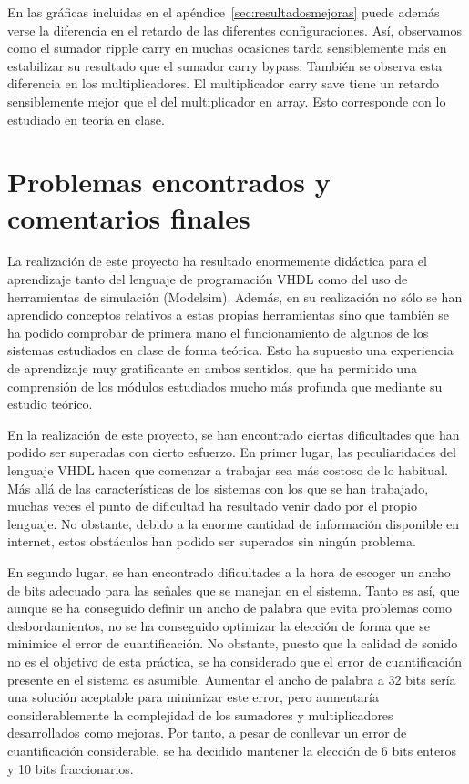 \documentclass[a4paper,12pt]{article}
\begin{document}
En las gráficas incluidas en el apéndice~\ref{sec:resultadosmejoras} puede además verse la diferencia en el retardo de las diferentes configuraciones. Así, observamos como el sumador ripple carry en muchas ocasiones tarda sensiblemente más en estabilizar su resultado que el sumador carry bypass. También se observa esta diferencia en los multiplicadores. El multiplicador carry save tiene un retardo sensiblemente mejor que el del multiplicador en array. Esto corresponde con lo estudiado en teoría en clase.

\section{Problemas encontrados y comentarios finales}
La realización de este proyecto ha resultado enormemente didáctica para el aprendizaje tanto del lenguaje de programación VHDL como del uso de herramientas de simulación (Modelsim). Además, en su realización no sólo se han aprendido conceptos relativos a estas propias herramientas sino que también se ha podido comprobar de primera mano el funcionamiento de algunos de los sistemas estudiados en clase de forma teórica. Esto ha supuesto una experiencia de aprendizaje muy gratificante en ambos sentidos, que ha permitido una comprensión de los módulos estudiados mucho más profunda que mediante su estudio teórico.

En la realización de este proyecto, se han encontrado ciertas dificultades que han podido ser superadas con cierto esfuerzo. En primer lugar, las peculiaridades del lenguaje VHDL hacen que comenzar a trabajar sea más costoso de lo habitual. Más allá de las características de los sistemas con los que se han trabajado, muchas veces el punto de dificultad ha resultado venir dado por el propio lenguaje. No obstante, debido a la enorme cantidad de información disponible en internet, estos obstáculos han podido ser superados sin ningún problema.

En segundo lugar, se han encontrado dificultades a la hora de escoger un ancho de bits adecuado para las señales que se manejan en el sistema. Tanto es así, que aunque se ha conseguido definir un ancho de palabra que evita problemas como desbordamientos, no se ha conseguido optimizar la elección de forma que se minimice el error de cuantificación. No obstante, puesto que la calidad de sonido no es el objetivo de esta práctica, se ha considerado que el error de cuantificación presente en el sistema es asumible. Aumentar el ancho de palabra a 32 bits sería una solución aceptable para minimizar este error, pero aumentaría considerablemente la complejidad de los sumadores y multiplicadores desarrollados como mejoras. Por tanto, a pesar de conllevar un error de cuantificación considerable, se ha decidido mantener la elección de 6 bits enteros y 10 bits fraccionarios.
\end{document}
